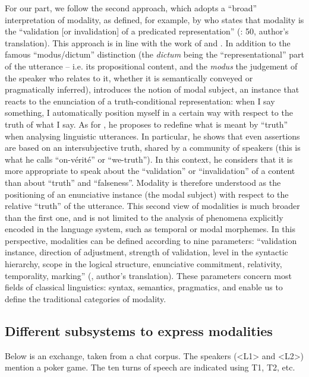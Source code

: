 \documentclass[output=paper]{langscibook}
\begin{document}
For our part, we follow the second approach, which adopts a “broad” interpretation of modality, as defined, for example, by \citet{Gosselin2010} who states that modality is the “validation [or invalidation] of a predicated representation” (\citealt{Gosselin2010}: 50, author’s translation). This approach is in line with the work of \citet{Bally1944} and \citet[59]{Berrendonner1981}. In addition to the famous “modus\slash dictum” distinction (the \textit{dictum} being the “representational” part of the utterance – i.e. its propositional content, and the \textit{modus} the judgement of the speaker who relates to it, whether it is semantically conveyed or pragmatically inferred), \citet{Bally1944} introduces the notion of modal subject, an instance that reacts to the enunciation of a truth-conditional representation: when I say something, I automatically position myself in a certain way with respect to the truth of what I say. As for \citet[59]{Berrendonner1981}, he proposes to redefine what is meant by “truth” when analysing linguistic utterances. In particular, he shows that even assertions are based on an intersubjective truth, shared by a community of speakers (this is what he calls “on-vérité” or “we-truth”). In this context, he considers that it is more appropriate to speak about the “validation” or “invalidation” of a content than about “truth” and “falseness”. Modality is therefore understood as the positioning of an enunciative instance (the modal subject) with respect to the relative “truth” of the utterance. This second view of modalities is much broader than the first one, and is not limited to the analysis of phenomena explicitly encoded in the language system, such as temporal or modal morphemes. In this perspective, modalities can be defined according to nine parameters: “validation instance, direction of adjustment, strength of validation, level in the syntactic hierarchy, scope in the logical structure, enunciative commitment, relativity, temporality, marking” (\citealt[60]{Gosselin2010}, author’s translation). These parameters concern most fields of classical linguistics: syntax, semantics, pragmatics, and enable us to define the traditional categories of modality.

\subsection{Different subsystems to express modalities}

Below is an exchange, taken from a chat corpus. The speakers (<L1> and <L2>) mention a poker game. The ten turns of speech are indicated using T1, T2, etc.
\end{document}
